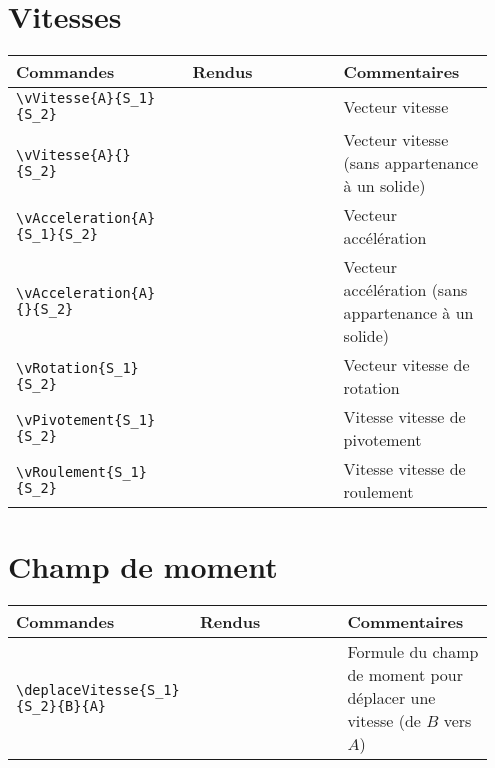 \documentclass[a4paper,10pt]{article}
\begin{document}
	\section{Vitesses}
	\noindent
	\begin{tabular}{|p{0.35\linewidth}|p{0.3\linewidth}|p{0.3\linewidth}|}
		\hline
			\textbf{Commandes}&\textbf{Rendus}&\textbf{Commentaires}
		\\\hline\hline
			\verb!\vVitesse{A}{S_1}! \verb!{S_2}!		&	\vVitesse{A}{S_1}{S_2}		&	Vecteur vitesse
		\\\hline
			\verb!\vVitesse{A}{}! \verb!{S_2}!		&	\vVitesse{A}{}{S_2}		&	Vecteur vitesse (sans appartenance à un solide)
		\\\hline
			\verb!\vAcceleration{A}! \verb!{S_1}{S_2}!	&	\vAcceleration{A}{S_1}{S_2}	&	Vecteur accélération
		\\\hline
			\verb!\vAcceleration{A}! \verb!{}{S_2}!	&	\vAcceleration{A}{}{S_2}	&	Vecteur accélération (sans appartenance à un solide)
		\\\hline
			\verb!\vRotation{S_1}{S_2}!			&	\vRotation{S_1}{S_2}		&	Vecteur vitesse de rotation
		\\\hline
			\verb!\vPivotement{S_1}{S_2}!	&	\vPivotement{S_1}{S_2}	&	Vitesse vitesse de pivotement
		\\\hline
			\verb!\vRoulement{S_1}{S_2}!	&	\vRoulement{S_1}{S_2}	&	Vitesse vitesse de roulement
		\\\hline
	\end{tabular}


	\section{Champ de moment}
	\noindent
	\begin{tabular}{|p{0.35\linewidth}|p{0.3\linewidth}|p{0.3\linewidth}|}
		\hline
			\textbf{Commandes}&\textbf{Rendus}&\textbf{Commentaires}
		\\\hline\hline
			\verb!\deplaceVitesse{S_1}! \verb!{S_2}{B}{A}!		&	\deplaceVitesse{S_1}{S_2}{B}{A}		&	Formule du champ de moment pour déplacer une vitesse (de $B$ vers $A$)
		\\\hline
	\end{tabular}
\end{document}
